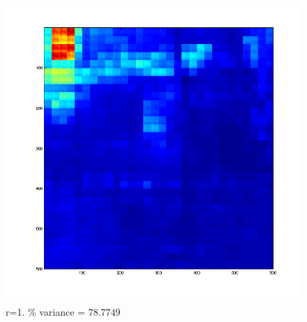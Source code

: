 \documentclass[12pt,english]{article}
\begin{document}
\begin{figure}
\begin{minipage}{0.5\linewidth}
    \includegraphics[width=\linewidth]{pca-part-c-Photo_Images-reconstructed-r=1.png}
    \caption{\footnotesize{r=1. \% variance = $78.7749$}}
\end{minipage}
\end{figure}
\end{document}
